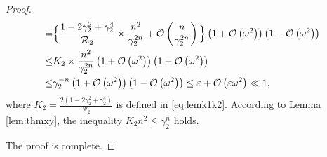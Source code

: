 \documentclass[10pt,a4paper]{amsart}
\begin{document}
\begin{proof}
\begin{align}
		=&\Big\{\frac{1-2\gamma_{2}^2+\gamma_{2}^4}{\mathcal{R}_{2}}\times\frac{n^2}{\gamma_{2}^{2n}}+\mathcal{O}\left(\frac{n}{\gamma_{2}^{2n}}\right)\Big\} \left(1+\mathcal{O}\left(\omega^2\right)\right)\left(1-\mathcal{O}\left(\omega^2\right)\right)\notag\\
		\leq&K_{2}\times\frac{n^2}{\gamma_{2}^{2n}} \left(1+\mathcal{O}\left(\omega^2\right)\right)\left(1-\mathcal{O}\left(\omega^2\right)\right)\notag\\
		\leq&\gamma_2^{-n}\left(1+\mathcal{O}\left(\omega^2\right)\right)\left(1-\mathcal{O}\left(\omega^2\right)\right)\leq\varepsilon+\mathcal{O}\left(\varepsilon\omega^2\right)\ll1,\notag
	\end{align}
	where $K_{2} =\frac{2\left(1-2\gamma_{2}^2+\gamma_{2}^4\right)}{\mathcal{R}_{2}}$ is defined in \eqref{eq:lemk1k2}. According to Lemma \ref{lem:thmxy}, the inequality $K_{2}n^2 \leq \gamma_{2}^{n}$ holds.
	
	The proof is complete.
\end{proof}
\end{document}
